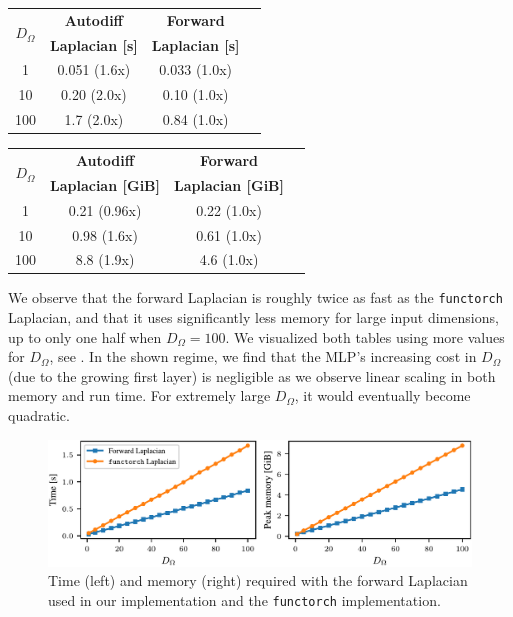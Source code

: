 \begin{minipage}{0.495\linewidth}
  \centering
    \begin{tabular}{cccc}
      \toprule
      \multirow{2}{*}{$D_{\Omega}$} & \textbf{Autodiff} & \textbf{Forward} \\
                                    &  \textbf{Laplacian [s]} & \textbf{Laplacian [s]}
      \\
      \midrule
      1   & 0.051 (1.6x) & 0.033 (1.0x) \\
      10  & 0.20 (2.0x)  & 0.10 (1.0x)  \\
      100 & 1.7 (2.0x)   & 0.84 (1.0x)  \\
      \bottomrule
    \end{tabular}
\end{minipage}
\hfill
\begin{minipage}{0.495\linewidth}
  \centering
    \begin{tabular}{cccc}
      \toprule
      \multirow{2}{*}{$D_{\Omega}$} & \textbf{Autodiff} & \textbf{Forward}
      \\
                                    &  \textbf{Laplacian [GiB]} & \textbf{Laplacian [GiB]}
      \\
      \midrule
      1   & 0.21 (0.96x) & 0.22 (1.0x) \\
      10  & 0.98 (1.6x)  & 0.61 (1.0x) \\
      100 & 8.8 (1.9x)   & 4.6 (1.0x)  \\
      \bottomrule
      \end{tabular}
\end{minipage}

We observe that the forward Laplacian is roughly twice as fast as the \texttt{functorch} Laplacian, and that it uses significantly less memory for large input dimensions, up to only one half when $D_\Omega=100$.
We visualized both tables using more values for $D_\Omega$, see .
In the shown regime, we find that the MLP's increasing cost in $D_{\Omega}$ (due to the growing first layer) is negligible as we observe linear scaling in both memory and run time. For extremely large $D_{\Omega}$, it would eventually become quadratic.

\begin{figure}[h]
  \centering
  \includegraphics[width=\linewidth]{figures/laplacian_benchmark.pdf}
  \caption{Time (left) and memory (right) required with the forward Laplacian used in our implementation and the \texttt{functorch} implementation.}
  \label{app:fig:comparison}
\end{figure}

